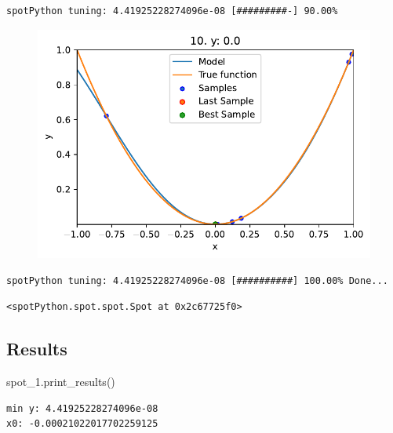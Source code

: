 \documentclass[
  letterpaper,
  DIV=11,
  numbers=noendperiod]{scrreprt}
\newenvironment{Shaded}{\begin{snugshade}}{\end{snugshade}}
\newcommand{\NormalTok}[1]{\textcolor[rgb]{0.00,0.23,0.31}{#1}}
\begin{document}
\begin{verbatim}
spotPython tuning: 4.41925228274096e-08 [#########-] 90.00% 
\end{verbatim}

\begin{figure}[H]

{\centering \includegraphics{04_spot_sklearn_surrogate_files/figure-pdf/cell-21-output-14.pdf}

}

\end{figure}

\begin{verbatim}
spotPython tuning: 4.41925228274096e-08 [##########] 100.00% Done...
\end{verbatim}

\begin{verbatim}
<spotPython.spot.spot.Spot at 0x2c67725f0>
\end{verbatim}

\hypertarget{results-2}{%
\subsection{Results}\label{results-2}}

\begin{Shaded}
\begin{Highlighting}[]
\NormalTok{spot\_1.print\_results()}
\end{Highlighting}
\end{Shaded}

\begin{verbatim}
min y: 4.41925228274096e-08
x0: -0.00021022017702259125
\end{verbatim}
\end{document}
